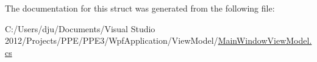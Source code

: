 The documentation for this struct was generated from the following file\-:\begin{DoxyCompactItemize}
\item 
C\-:/\-Users/dju/\-Documents/\-Visual Studio 2012/\-Projects/\-P\-P\-E/\-P\-P\-E3/\-Wpf\-Application/\-View\-Model/\hyperlink{_main_window_view_model_8cs}{Main\-Window\-View\-Model.\-cs}\end{DoxyCompactItemize}
